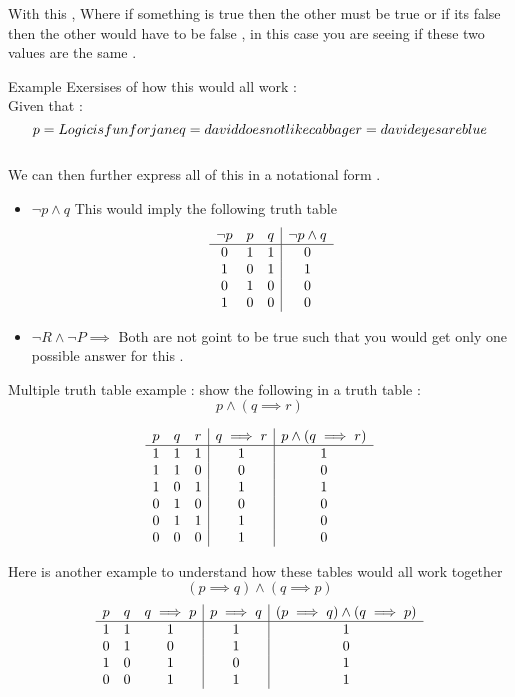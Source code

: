 \documentclass{article}
\theoremstyle{mytheoremstyle}
\theoremstyle{mytheoremstyle}
\theoremstyle{myproblemstyle}
\begin{document}
With this , Where if something is true then the other must be true or if its false then the other would have to be false , in this case you are seeing if these two values are the same .

Example Exersises of how this would all work :
\\
Given that :
\[p = Logic is fun for jane \\ \\
q = david does not like cabbage \\ \\
r = david eyes are blue \]\\

We can then further express all of this in a notational form .
\begin{itemize}
    \item $\neg p \land q$
        This would imply the following truth table
        \[\begin{array}{c c c | c }
            \neg p & p & q & \neg p \land q \\
            \hline
              0 & 1 & 1 & 0 \\
              1 & 0 & 1 & 1 \\
              0 & 1 & 0 & 0 \\
              1 & 0 & 0 & 0
        \end{array}\]
    \item $\neg R \land \neg P \implies$  Both are not goint to be true such that you would get only one possible answer for this  .
\end{itemize}


Multiple truth table example :
show the following in a truth table :
\\
\[p \land (q \implies r) \]

\[\begin{array}{c c c | c | c }
    p & q & r & q \implies r & p \land (q \implies r) \\
    \hline
    1 & 1 & 1 & 1 & 1 \\
    1 & 1 & 0 & 0 & 0\\
    1 & 0 & 1 & 1 & 1\\
    0 & 1 & 0 & 0 & 0\\
    0 & 1 & 1 & 1 & 0\\
    0 & 0 & 0 & 1 & 0\\

\end{array}\]

Here is another example to understand how these tables would all work together
\\
\[(p \implies q) \land (q \implies p)\]
\[\begin{array}{c c c | c | c}
    p & q & q \implies p & p \implies q & (p \implies q) \land (q \implies p)\\
    \hline
    1 &  1 & 1 & 1 & 1 \\
    0 &  1 & 0 & 1 & 0 \\
    1 &  0 & 1 & 0 & 1 \\
    0 &  0 & 1 & 1 & 1 \\
\end{array}\] \\
\end{document}
